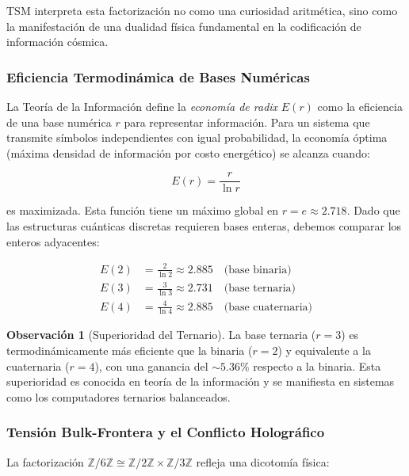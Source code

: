 \documentclass[11pt, a4paper]{article}
\theoremstyle{plain}
\theoremstyle{definition}
\newtheorem{observacion}[teorema]{Observación}
\newcommand{\Zmod}{\mathbb{Z}/6\mathbb{Z}}
\begin{document}
TSM interpreta esta factorización no como una curiosidad aritmética, sino como la manifestación de una dualidad física fundamental en la codificación de información cósmica.

\subsubsection{Eficiencia Termodinámica de Bases Numéricas}

La Teoría de la Información define la \textit{economía de radix} $E(r)$ como la eficiencia de una base numérica $r$ para representar información. Para un sistema que transmite símbolos independientes con igual probabilidad, la economía óptima (máxima densidad de información por costo energético) se alcanza cuando:

\begin{equation}
E(r) = \frac{r}{\ln r}
\end{equation}

es maximizada. Esta función tiene un máximo global en $r = e \approx 2.718$. Dado que las estructuras cuánticas discretas requieren bases enteras, debemos comparar los enteros adyacentes:

\begin{align}
E(2) &= \frac{2}{\ln 2} \approx 2.885 \quad \text{(base binaria)} \\
E(3) &= \frac{3}{\ln 3} \approx 2.731 \quad \text{(base ternaria)} \\
E(4) &= \frac{4}{\ln 4} \approx 2.885 \quad \text{(base cuaternaria)}
\end{align}

\begin{observacion}[Superioridad del Ternario]
La base ternaria ($r=3$) es termodinámicamente más eficiente que la binaria ($r=2$) y equivalente a la cuaternaria ($r=4$), con una ganancia del $\sim 5.36\%$ respecto a la binaria. Esta superioridad es conocida en teoría de la información y se manifiesta en sistemas como los computadores ternarios balanceados.
\end{observacion}

\subsubsection{Tensión Bulk-Frontera y el Conflicto Holográfico}

La factorización $\Zmod \cong \mathbb{Z}/2\mathbb{Z} \times \mathbb{Z}/3\mathbb{Z}$ refleja una dicotomía física:
\end{document}
